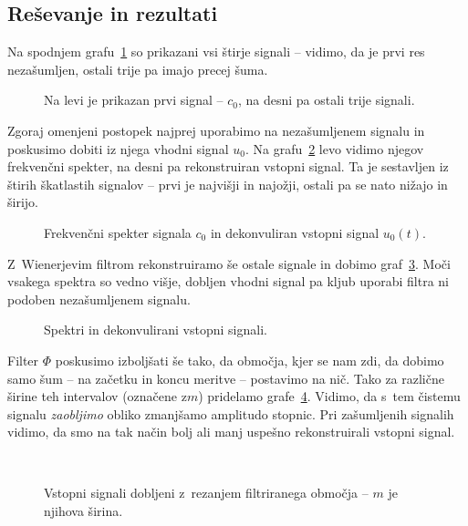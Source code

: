 \documentclass[a4paper,pdftex,10pt]{article}
\numberwithin{figure}{section} %
\begin{document}
\subsection{Reševanje in rezultati}
Na spodnjem grafu~\ref{slika6} so prikazani vsi štirje signali -- vidimo, da je prvi res
nezašumljen, ostali trije pa imajo precej šuma.
\begin{figure}[H]
    \centering
    \resizebox{0.49\linewidth}{!}{}
    \resizebox{0.49\linewidth}{!}{}
    \caption{Na levi je prikazan prvi signal -- $c_0$, na desni pa ostali trije signali.}
    \label{slika6}
\end{figure}
Zgoraj omenjeni postopek najprej uporabimo na nezašumljenem signalu  in 
poskusimo dobiti iz njega vhodni signal $u_0$. Na grafu~\ref{slika7} levo vidimo njegov
frekvenčni spekter, na desni pa rekonstruiran vstopni signal. Ta je sestavljen iz štirih
škatlastih signalov -- prvi je najvišji in najožji, ostali pa se nato nižajo in širijo.
\begin{figure}[H]
    \centering
    \resizebox{0.49\linewidth}{!}{}
    \resizebox{0.49\linewidth}{!}{}
    \caption{Frekvenčni spekter signala $c_0$ in dekonvuliran vstopni signal $u_0(t)$.}
    \label{slika7}
\end{figure}
Z~Wienerjevim filtrom rekonstruiramo še ostale signale in dobimo graf~\ref{slika8}. Moči
vsakega spektra so vedno višje, dobljen vhodni signal pa kljub uporabi filtra ni podoben
nezašumljenem signalu.
\begin{figure}[H]
    \centering
    \resizebox{0.49\linewidth}{!}{}
    \resizebox{0.49\linewidth}{!}{}
    \caption{Spektri in dekonvulirani vstopni signali.}
    \label{slika8}
\end{figure}
Filter $\Phi$ poskusimo izboljšati še tako, da območja, kjer se nam zdi, da dobimo samo
šum -- na začetku in koncu meritve -- postavimo na nič. Tako za različne širine teh 
intervalov (označene z$m$) pridelamo grafe~\ref{slika9}. Vidimo, da s~tem čistemu signalu
\emph{zaobljimo} obliko zmanjšamo amplitudo stopnic. Pri zašumljenih signalih vidimo,
da smo na tak način bolj ali manj uspešno rekonstruirali vstopni signal.
\begin{figure}[H]
    \centering
    \resizebox{0.49\linewidth}{!}{}
    \resizebox{0.49\linewidth}{!}{} \\
    \resizebox{0.49\linewidth}{!}{}
    \resizebox{0.49\linewidth}{!}{}
    \caption{Vstopni signali dobljeni z~rezanjem filtriranega območja -- $m$ je njihova 
    širina.}
    \label{slika9}
\end{figure}
\end{document}
